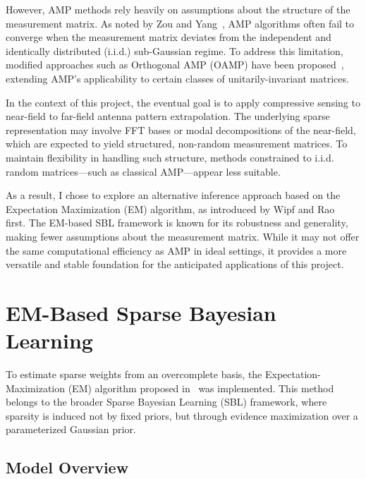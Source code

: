 \documentclass{article}
\begin{document}
However, AMP methods rely heavily on assumptions about the structure of the measurement matrix. As noted by Zou and Yang~\cite{zou2022concise}, AMP algorithms often fail to converge when the measurement matrix deviates from the independent and identically distributed (i.i.d.) sub-Gaussian regime. To address this limitation, modified approaches such as Orthogonal AMP (OAMP) have been proposed~\cite{zou2022concise}, extending AMP's applicability to certain classes of unitarily-invariant matrices.

In the context of this project, the eventual goal is to apply compressive sensing to near-field to far-field antenna pattern extrapolation. The underlying sparse representation may involve FFT bases or modal decompositions of the near-field, which are expected to yield structured, non-random measurement matrices. To maintain flexibility in handling such structure, methods constrained to i.i.d. random matrices—such as classical AMP—appear less suitable.

As a result, I chose to explore an alternative inference approach based on the Expectation Maximization (EM) algorithm, as introduced by Wipf and Rao~\cite{wipf2004sparse} first. The EM-based SBL framework is known for its robustness and generality, making fewer assumptions about the measurement matrix. While it may not offer the same computational efficiency as AMP in ideal settings, it provides a more versatile and stable foundation for the anticipated applications of this project.

\section{EM-Based Sparse Bayesian Learning}

To estimate sparse weights from an overcomplete basis, the Expectation-Maximization (EM) algorithm proposed in~\cite{wipf2004sparse} was implemented. This method belongs to the broader Sparse Bayesian Learning (SBL) framework, where sparsity is induced not by fixed priors, but through evidence maximization over a parameterized Gaussian prior.

\subsection{Model Overview}
\end{document}
